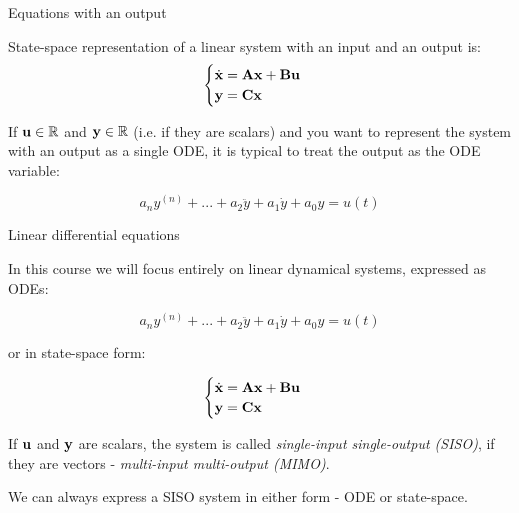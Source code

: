 \documentclass{beamer}
\begin{document}
\begin{frame}{Equations with an output}
	\begin{flushleft}
		
		State-space representation of a linear system with an input and an output is:
		\begin{equation}
		\begin{cases}
				\dot{\mathbf{x}} = \mathbf{A} \mathbf{x} + \mathbf{B}\mathbf{u} \\
				\mathbf{y} = \mathbf{C}\mathbf{x}
		\end{cases}
		\end{equation}
		
		If $\mathbf{u} \in \mathbb{R}$ and $\mathbf{y} \in \mathbb{R}$ (i.e. if they are scalars) and you want to represent the system with an output as a single ODE, it is typical to treat the output as the ODE variable:
		
		\begin{equation}
			a_n y^{(n)} + 
			... +
			a_2 \ddot{y} + a_1 \dot{y} + 
			a_0 y = u(t)
		\end{equation}
		
	\end{flushleft}
\end{frame}






\begin{frame}{Linear differential equations}
\begin{flushleft}

In this course we will focus entirely on linear dynamical systems, expressed as ODEs:

\begin{equation}
    a_n y^{(n)} +
    ... +
    a_2 \ddot{y} + a_1 \dot{y} + 
    a_0 y = u(t)
\end{equation}

or in state-space form:

\begin{equation}
	\begin{cases}
		\dot{\mathbf{x}} = \mathbf{A} \mathbf{x} + \mathbf{B}\mathbf{u} \\
		\mathbf{y} = \mathbf{C}\mathbf{x}
	\end{cases}
\end{equation}

If $\mathbf{u}$ and $\mathbf{y}$ are scalars, the system is called \emph{single-input single-output (SISO)}, if they are vectors - \emph{multi-input multi-output (MIMO)}.

\bigskip

We can always express a SISO system in either form - ODE or state-space.

\end{flushleft}
\end{frame}
\end{document}
